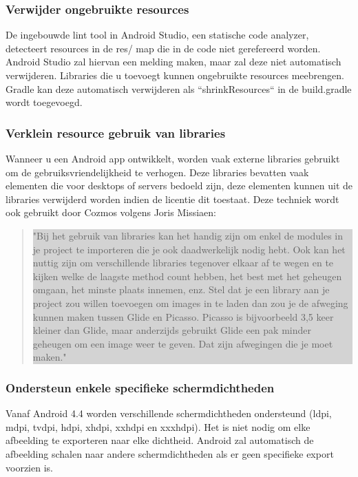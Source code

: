 \subsubsection{Verwijder ongebruikte resources}
\label{sec:removeunusedresources}
De ingebouwde lint tool in Android Studio, een statische code analyzer, detecteert resources in de res/ map die in de code niet gerefereerd worden. Android Studio zal hiervan een melding maken, maar zal deze niet automatisch verwijderen. Libraries die u toevoegt kunnen ongebruikte resources meebrengen. Gradle kan deze automatisch verwijderen als ``shrinkResources`` in de build.gradle wordt toegevoegd. 

\subsubsection{Verklein resource gebruik van libraries}
\label{sec:minimizeresourceslibraries}
Wanneer u een Android app ontwikkelt, worden vaak externe libraries gebruikt om de gebruiksvriendelijkheid te verhogen. Deze libraries bevatten vaak elementen die voor desktops of servers bedoeld zijn, deze elementen kunnen uit de libraries verwijderd worden indien de licentie dit toestaat. Deze techniek wordt ook gebruikt door Cozmos volgens Joris Missiaen: 
\begin{quote}
	\vspace{-15ex}
	\colorbox{lightgray}{\parbox{350px}{"Bij het gebruik van libraries kan het handig zijn om enkel de modules in je project te importeren die je ook daadwerkelijk nodig hebt. Ook kan het nuttig zijn om verschillende libraries tegenover elkaar af te wegen en te kijken welke de laagste method count hebben, het best met het geheugen omgaan, het minste plaats innemen, enz. Stel dat je een library aan je project zou willen toevoegen om images in te laden dan zou je de afweging kunnen maken tussen Glide en Picasso. Picasso is bijvoorbeeld 3,5 keer kleiner dan Glide, maar anderzijds gebruikt Glide een pak minder geheugen om een image weer te geven. Dat zijn afwegingen die je moet maken."}}
	\vspace{-3ex}
\end{quote}

\subsubsection{Ondersteun enkele specifieke schermdichtheden }
\label{sec:supportspecificdensities}
Vanaf Android 4.4 worden verschillende schermdichtheden ondersteund (ldpi, mdpi, tvdpi, hdpi, xhdpi, xxhdpi en xxxhdpi). Het is niet nodig om elke afbeelding te exporteren naar elke dichtheid. Android zal automatisch de afbeelding schalen naar andere schermdichtheden als er geen specifieke export voorzien is. 

